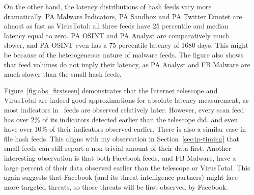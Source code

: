 On the other hand, the latency distributions of hash feeds vary more dramatically.
PA Malware Indicators, PA Sandbox and PA Twitter Emotet are almost as fast as
VirusTotal: all three feeds have 25 percentile and median latency equal to zero.
PA OSINT and PA Analyst are comparatively much slower, and PA OSINT even has a 75
percentile latency of 1680 days. This might be because of the heterogeneous nature of
malware feeds. The figure also shows that feed volumes do not imply
their latency, as PA Analyst and FB Malware are much slower than the small hash
feeds.

Figure~\ref{fig:abs_firstseen} demonstrates that the Internet telescope and VirusTotal
are indeed good approximations for absolute latency measurement, as most
indicators in \ti\ feeds are observed relatively later. However, every scan
feed has over 2\% of its indicators detected earlier than the telescope did.
{\feedFBBasecamp} and {\feeddshield} even have over 10\% of their indicators observed
earlier. There is also a similar case in file hash feeds. This aligns with
my observation in Section~\ref{sec:ip-timing} that small feeds can still report
a non-trivial amount of their data first. Another interesting observation is that
both Facebook feeds, {\feedFBBasecamp} and FB Malware, have a large percent of
their data observed earlier than the telescope or VirusTotal. This again suggests
that Facebook (and its threat intelligence partners) might face more targeted
threats, so those threats will be first observed by Facebook.
